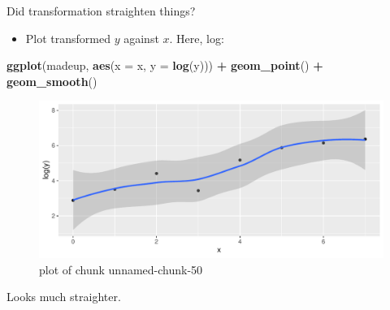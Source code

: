 \documentclass[ignorenonframetext,]{beamer}
\newenvironment{Shaded}{\begin{snugshade}}{\end{snugshade}}
\newcommand{\DataTypeTok}[1]{\textcolor[rgb]{0.13,0.29,0.53}{#1}}
\newcommand{\KeywordTok}[1]{\textcolor[rgb]{0.13,0.29,0.53}{\textbf{#1}}}
\newcommand{\NormalTok}[1]{#1}
\newcommand{\OperatorTok}[1]{\textcolor[rgb]{0.81,0.36,0.00}{\textbf{#1}}}
\newcommand{\StringTok}[1]{\textcolor[rgb]{0.31,0.60,0.02}{#1}}
\providecommand{\tightlist}{%
  \setlength{\itemsep}{0pt}\setlength{\parskip}{0pt}}
\begin{document}
\begin{frame}[fragile]{Did transformation straighten things?}
\protect\hypertarget{did-transformation-straighten-things}{}

\begin{itemize}
\tightlist
\item
  Plot transformed \(y\) against \(x\). Here, log:
\end{itemize}

\begin{Shaded}
\begin{Highlighting}[]
\KeywordTok{ggplot}\NormalTok{(madeup, }\KeywordTok{aes}\NormalTok{(}\DataTypeTok{x =}\NormalTok{ x, }\DataTypeTok{y =} \KeywordTok{log}\NormalTok{(y))) }\OperatorTok{+}\StringTok{ }\KeywordTok{geom_point}\NormalTok{() }\OperatorTok{+}
\StringTok{  }\KeywordTok{geom_smooth}\NormalTok{()}
\end{Highlighting}
\end{Shaded}

\begin{figure}
\centering
\includegraphics{figure/unnamed-chunk-50-1.pdf}
\caption{plot of chunk unnamed-chunk-50}
\end{figure}

Looks much straighter.

\end{frame}
\end{document}
